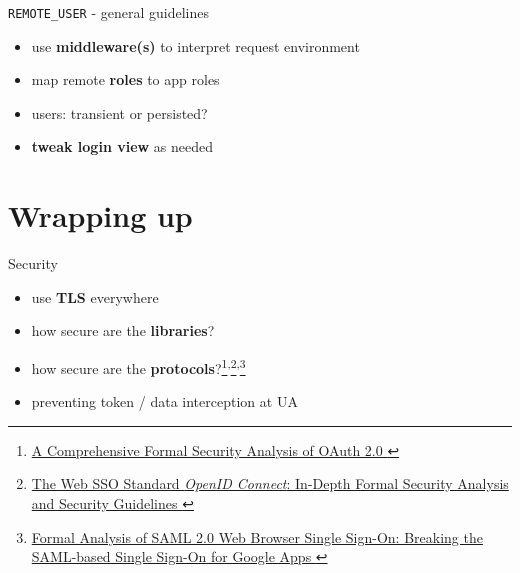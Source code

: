 \documentclass[ignorenonframetext,aspectratio=169]{beamer}
\providecommand{\tightlist}{%
  \setlength{\itemsep}{0pt}\setlength{\parskip}{0pt}}
\begin{document}
\begin{frame}{{\tt REMOTE\_USER} - general guidelines}
\begin{itemize}
\tightlist
\item use {\bf middleware(s)} to interpret request environment
\item map remote {\bf roles} to app roles
\item users: transient or persisted?
\item {\bf tweak login view} as needed
\end{itemize}
\end{frame}

\section{Wrapping up}

\begin{frame}{Security}
\begin{itemize}
\tightlist
\item use {\bf TLS} everywhere
\item how secure are the {\bf libraries}?
\item how secure are the {\bf
    protocols}?\footnote{
        \href{https://arxiv.org/pdf/1601.01229v2.pdf}{
            A Comprehensive Formal Security Analysis of OAuth 2.0
        }
    }\textsuperscript{,}\footnote{
        \href{https://arxiv.org/pdf/1704.08539.pdf}{
            The Web SSO Standard {\em OpenID Connect}:
            In-Depth Formal Security Analysis and Security Guidelines
        }
    }\textsuperscript{,}\footnote{
        \href{https://ai-lab.it/armando/pub/fmse9-armando.pdf}{
            Formal Analysis of SAML 2.0 Web Browser Single Sign-On:
            Breaking the SAML-based Single Sign-On for Google Apps
        }
    }
\item preventing token / data interception at UA
\end{itemize}
\end{frame}
\end{document}
